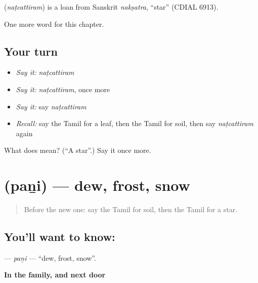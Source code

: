 \begin{cousinweb}
\textbf{} (\emph{naṭcattiram}) is a loan from Sanskrit \emph{nakṣatra}, \textquotedblleft{}star\textquotedblright{} (CDIAL 6913).
\end{cousinweb}

\begin{grammarlens}[title={What you've built}]
One more word for this chapter.
\end{grammarlens}

\subsection*{Your turn}
\begin{itemize}
\raggedright
  \item \emph{Say it:} \emph{naṭcattiram}
  \item \emph{Say it:} \emph{naṭcattiram}, once more
  \item \emph{Say it:} say \emph{naṭcattiram}
  \item \emph{Recall:} say the Tamil for a leaf, then the Tamil for soil, then say \emph{naṭcattiram} again
\end{itemize}

\begin{tcolorbox}[breakable,colback=teal!4,colframe=teal!35!black,title={Before you move on}]
What does  mean? (\textquotedblleft{}A star\textquotedblright{}.) Say it once more.
\end{tcolorbox}
\section[\texorpdfstring{\ta{பனி} (paṉi)}{பனி (paṉi)}]{ (paṉi) — dew, frost, snow}

\label{lesson:TA-C127-pani}



\begin{quote}
Before the new one: say the Tamil for soil, then the Tamil for a star.
\end{quote}

\subsection*{You'll want to know: }
\textbf{} — \emph{paṉi} — \textquotedblleft{}dew, frost, snow\textquotedblright{}.

\textbf{In the family, and next door}

